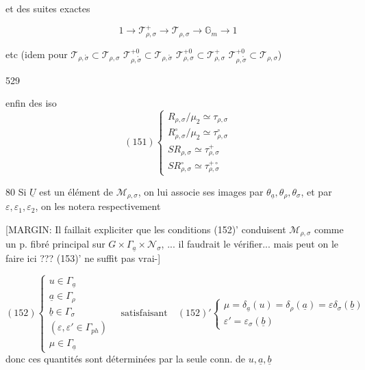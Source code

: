 \begin{enumerate}
et des suites exactes

$$ 1 \to \mathcal{T}_{\rho,\sigma}^+ \to \mathcal{T}_{\rho,\sigma} \to \mathbb{G}_m \to 1 $$

etc (idem pour 
$\mathcal{T}_{\rho,\mathring{\sigma}} \subset \mathcal{T}_{\rho,\sigma}$
$\mathcal{T}_{\rho,\mathring{\sigma}}^{+0} \subset \mathcal{T}_{\rho,\mathring{\sigma}}$
$\mathcal{T}_{\rho,\sigma}^{+0} \subset \mathcal{T}_{\rho,\sigma}^+$
$\mathcal{T}_{\rho,\mathring{\sigma}}^{+0} \subset \mathcal{T}_{\rho,\sigma}$)

\newpage


529

enfin des iso
$$ (151) \begin{cases}
R_{\rho,\sigma} / \mu_2 \simeq \tau_{\rho,\sigma} \\
R_{\rho,\sigma}^{\circ} / \mu_2 \simeq \tau_{\rho,\sigma}^{\circ} \\
S R_{\rho,\sigma} \simeq \tau_{\rho,\sigma}^{+} \\
S R_{\rho,\sigma}^{\circ} \simeq \tau_{\rho,\sigma}^{+\circ}
\end{cases} $$

80
Si $\underline{U}$ est un élément de $\mathcal{M}_{\rho,\sigma}$, on lui
associe ses images par $\theta_{\underline{a}}, \theta_{\rho}, \theta_{\sigma}$, et par
$\varepsilon, \varepsilon_1, \varepsilon_2$, on les notera respectivement

[MARGIN: Il faillait expliciter que les conditions (152)' conduisent $\mathcal{M}_{\rho,\sigma}$ comme un p. fibré principal sur $G \times \Gamma_{\underline{a}} \times \mathcal{N}_{\sigma}$, ... il faudrait le vérifier... mais peut on le faire ici ??? (153)' ne suffit pas vrai-]

$$ (152) \begin{cases}
u \in \Gamma_{\underline{a}} \\
\underline{a} \in \Gamma_{\rho} \\
\underline{b} \in \Gamma_{\sigma} \\
(\varepsilon, \varepsilon' \in \Gamma_{ph}) \\
\mu \in \Gamma_{\underline{a}}
\end{cases} \quad \text{satisfaisant} \quad (152)' \begin{cases}
\mu = \delta_{\underline{a}}(u) = \delta_{\rho}(\underline{a}) = \varepsilon \delta_{\sigma}(\underline{b}) \\
\varepsilon' = \varepsilon_{\sigma}(\underline{b})
\end{cases} $$
donc ces quantités sont
déterminées par la seule
conn. de $u, \underline{a}, \underline{b}$


\end{enumerate}
